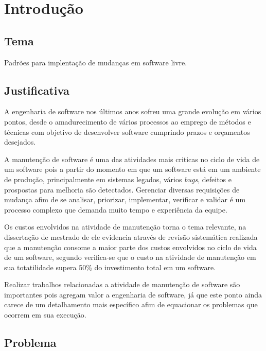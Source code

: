 \chapter{Introdução}
\label{cap-introducao}

\section{Tema}
Padrões para implentação de mudanças em software livre.
\section{Justificativa}

A engenharia de software nos últimos anos sofreu uma grande evolução em vários pontos, desde o amadurecimento de vários processos ao emprego de métodos e técnicas com objetivo de desenvolver software cumprindo prazos e orçamentos desejados.

A manutenção de software é uma das atividades mais criticas no ciclo de vida de um software pois a partir do momento em que um software está em um ambiente de produção, principalmente em sistemas legados, vários \emph{bugs}, defeitos e prospostas para melhoria são detectados. Gerenciar diversas requisições de mudança afim de se analisar, priorizar, implementar, verificar e validar é um processo complexo que demanda muito tempo e experiência da equipe.

Os custos envolvidos na atividade de manutenção torna o tema relevante, na dissertação de mestrado de  ele evidencia através de revisão sistemática realizada que a manutenção consome a maior parte dos custos envolvidos no ciclo de vida de um software, segundo  verifica-se que o custo na atividade de manutenção em sua totatilidade supera 50\% do investimento total em um software. 

Realizar trabalhos relacionadas a atividade de manutenção de software são importantes pois agregam valor a engenharia de software, já que este ponto ainda carece de um detalhamento mais específico afim de equacionar os problemas que ocorrem em sua execução.

\section{Problema}

